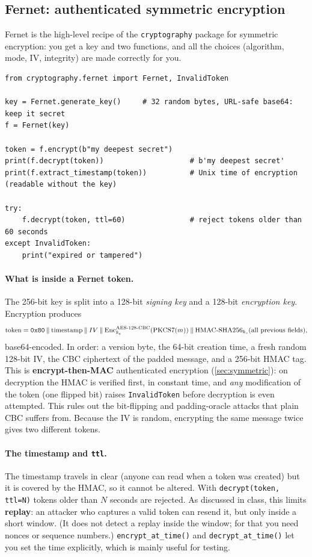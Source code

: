 \subsection{Fernet: authenticated symmetric encryption}

Fernet is the high-level recipe of the \texttt{cryptography} package for symmetric encryption: you get a key and two functions, and all the choices (algorithm, mode, IV, integrity) are made correctly for you.

\begin{verbatim}
from cryptography.fernet import Fernet, InvalidToken

key = Fernet.generate_key()     # 32 random bytes, URL-safe base64: keep it secret
f = Fernet(key)

token = f.encrypt(b"my deepest secret")
print(f.decrypt(token))                    # b'my deepest secret'
print(f.extract_timestamp(token))          # Unix time of encryption (readable without the key)

try:
    f.decrypt(token, ttl=60)               # reject tokens older than 60 seconds
except InvalidToken:
    print("expired or tampered")
\end{verbatim}

\paragraph{What is inside a Fernet token.} The 256-bit key is split into a 128-bit \emph{signing key} and a 128-bit \emph{encryption key}. Encryption produces
\[
    \text{token} = \texttt{0x80} \mathbin{\|} \text{timestamp} \mathbin{\|} IV \mathbin{\|} \operatorname{Enc}^{\text{AES-128-CBC}}_{k_e}(\text{PKCS7}(m)) \mathbin{\|} \mathrm{HMAC\text{-}SHA256}_{k_s}(\text{all previous fields}),
\]
base64-encoded. In order: a version byte, the 64-bit creation time, a fresh random 128-bit IV, the CBC ciphertext of the padded message, and a 256-bit HMAC tag. This is \textbf{encrypt-then-MAC} authenticated encryption (\cref{sec:symmetric}): on decryption the HMAC is verified first, in constant time, and \emph{any} modification of the token (one flipped bit) raises \texttt{InvalidToken} before decryption is even attempted. This rules out the bit-flipping and padding-oracle attacks that plain CBC suffers from. Because the IV is random, encrypting the same message twice gives two different tokens.

\paragraph{The timestamp and \texttt{ttl}.} The timestamp travels in clear (anyone can read when a token was created) but it is covered by the HMAC, so it cannot be altered. With \texttt{decrypt(token, ttl=N)} tokens older than $N$ seconds are rejected. As discussed in class, this limits \textbf{replay}: an attacker who captures a valid token can resend it, but only inside a short window. (It does not detect a replay inside the window; for that you need nonces or sequence numbers.) \texttt{encrypt_at_time()} and \texttt{decrypt_at_time()} let you set the time explicitly, which is mainly useful for testing.

